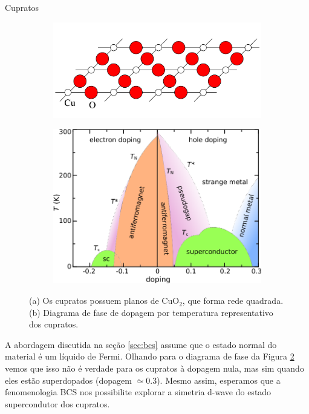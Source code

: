 \documentclass[a4paper,10pt]{article}
\begin{document}
\begin{section}{Cupratos}
\begin{figure}[H]
\centering
\begin{subfigure}{.5\textwidth}
  \centering
  \includegraphics[width=\linewidth]{fig/cuo2.png}
  \caption{}
  \label{fig:cuo2}
\end{subfigure}
\begin{subfigure}{.34\textwidth}
  \centering
  \includegraphics[width=\linewidth]{fig/cuprate-phasediag.png}
  \caption{}
  \label{fig:cuprate-phasediag}
\end{subfigure}
\caption{(a) Os cupratos possuem planos de CuO$_2$, que forma rede quadrada. (b) Diagrama de fase de dopagem por temperatura representativo dos cupratos.}
\label{fig:cuprates}
\end{figure}

A abordagem discutida na seção \ref{sec:bcs} assume que o estado normal do material é um líquido de Fermi. Olhando para o diagrama de fase da Figura \ref{fig:cuprate-phasediag} vemos que isso não é verdade para os cupratos à dopagem nula, mas sim quando eles estão superdopados (dopagem $\simeq 0.3$). Mesmo assim, esperamos que a fenomenologia BCS nos possibilite explorar a simetria d-wave do estado supercondutor dos cupratos.


\end{section}
\end{document}

